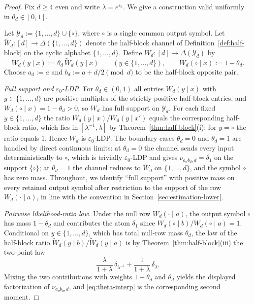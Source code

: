 \documentclass[11pt]{amsart}
\numberwithin{equation}{section}
\theoremstyle{definition}
\begin{document}
\begin{proof}
Fix $d\ge 4$ even and write $\lambda=e^{\varepsilon_0}$.  We give a construction valid uniformly in
$\theta_d\in[0,1]$.

Let $\mathcal Y_d:=\{1,\dots,d\}\cup\{\circ\}$, where $\circ$ is a single common output symbol.
Let $\widetilde W_d:[d]\to\Delta(\{1,\dots,d\})$ denote the half-block channel of
Definition~\ref{def:half-block} on the cyclic alphabet $\{1,\dots,d\}$.
Define $W_d:[d]\to\Delta(\mathcal Y_d)$ by
\[
W_d(y\mid x):=
\theta_d\,\widetilde W_d(y\mid x)
\qquad (y\in\{1,\dots,d\}),
\qquad
W_d(\circ\mid x):=1-\theta_d.
\]
Choose $a_d:=a$ and $b_d:=a+d/2\pmod d$ to be the half-block opposite pair.

\medskip
\noindent\emph{Full support and $\varepsilon_0$-LDP.}  For $\theta_d\in(0,1)$ all entries
$W_d(y\mid x)$ with $y\in\{1,\dots,d\}$ are positive multiples of the strictly positive
half-block entries, and $W_d(\circ\mid x)=1-\theta_d>0$, so $W_d$ has full support on $\mathcal Y_d$.
For each fixed $y\in\{1,\dots,d\}$ the ratio $W_d(y\mid x)/W_d(y\mid x')$ equals the corresponding
half-block ratio, which lies in $[\lambda^{-1},\lambda]$ by Theorem~\ref{thm:half-block}(i); for
$y=\circ$ the ratio equals $1$.  Hence $W_d$ is $\varepsilon_0$-LDP.  The boundary cases
$\theta_d=0$ and $\theta_d=1$ are handled by direct continuous limits: at $\theta_d=0$ the channel
sends every input deterministically to $\circ$, which is trivially $\varepsilon_0$-LDP and gives
$\nu_{a_db_d,d}=\delta_1$ on the support $\{\circ\}$; at $\theta_d=1$ the channel reduces to
$\widetilde W_d$ on $\{1,\dots,d\}$, and the symbol $\circ$ has zero mass.  Throughout, we identify
``full support'' with positive mass on every retained output symbol after restriction to the support
of the row $W_d(\cdot\mid a)$, in line with the convention in Section~\ref{sec:estimation-lower}.

\medskip
\noindent\emph{Pairwise likelihood-ratio law.}  Under the null row $W_d(\cdot\mid a)$, the output
symbol $\circ$ has mass $1-\theta_d$ and contributes the atom $\delta_1$ since
$W_d(\circ\mid b)/W_d(\circ\mid a)=1$.  Conditional on $y\in\{1,\dots,d\}$, which has total
null-row mass $\theta_d$, the law of the half-block ratio
$\widetilde W_d(y\mid b)/\widetilde W_d(y\mid a)$ is by Theorem~\ref{thm:half-block}(iii) the
two-point law
\[
\frac{\lambda}{1+\lambda}\,\delta_{\lambda^{-1}}
+
\frac{1}{1+\lambda}\,\delta_{\lambda}.
\]
Mixing the two contributions with weights $1-\theta_d$ and $\theta_d$ yields the displayed
factorization of $\nu_{a_db_d,d}$, and \eqref{eq:theta-interp} is the corresponding second moment.
\end{proof}
\end{document}
